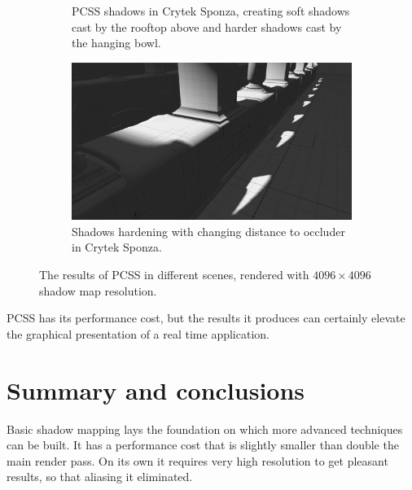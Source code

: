 \begin{figure}[h]
\begin{subfigure}[t]{0.49\textwidth}
        \caption{PCSS shadows in Crytek Sponza, creating soft shadows cast by the rooftop above and harder shadows cast by the hanging bowl.}
    \end{subfigure}
	\hfill
    \begin{subfigure}[t]{0.49\textwidth}
		\centering
        \includegraphics[width=\textwidth]{./graf/tests/pcss/cropped/sponza_pcss_2.png}
        \caption{Shadows hardening with changing distance to occluder in Crytek Sponza.}
    \end{subfigure}

    \caption{The results of PCSS in different scenes, rendered with \(4096\times 4096\) shadow map resolution.}
    \label{fig:test_pcss_screens}
\end{figure}

PCSS has its performance cost, but the results it produces can certainly elevate the graphical presentation of a real time application.

\section{Summary and conclusions}

Basic shadow mapping lays the foundation on which more advanced techniques can be built. It has a performance cost that is slightly smaller than double the main render pass. On its own it requires very high resolution to get pleasant results, so that aliasing it eliminated.

